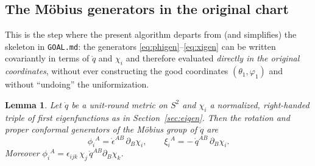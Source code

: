 \documentclass[11pt]{article}
\newtheorem{lemma}{Lemma}
\newcommand{\qo}{\mathring{q}}          %
\newcommand{\epso}{\mathring{\epsilon}} %
\begin{document}
\subsection{The M\"obius generators in the original chart}
\label{sec:generators}

This is the step where the present algorithm departs from (and simplifies)
the skeleton in \texttt{GOAL.md}: the generators
\eqref{eq:phigen}--\eqref{eq:xigen} can be written covariantly in terms of
$\qo$ and $\chi_i$ and therefore evaluated \emph{directly in the original
coordinates}, without ever constructing the good coordinates
$(\theta_1,\varphi_1)$ and without ``undoing'' the uniformization.

\begin{lemma}\label{lem:generators}
Let $\qo$ be a unit-round metric on $S^2$ and $\chi_i$ a normalized,
right-handed triple of first eigenfunctions as in
Section~\ref{sec:eigen}.  Then the rotation and proper conformal generators
of the M\"obius group of $\qo$ are
\begin{equation}
  \boxed{\;
  \phi_i{}^A = \epso^{AB}\,\partial_B \chi_i,
  \qquad
  \xi_i{}^A = -\,\qo^{AB}\,\partial_B \chi_i .
  \;}
  \label{eq:generatorscov}
\end{equation}
Moreover $\phi_i{}^A = \epsilon_{ijk}\,\chi_j\,\qo^{AB}\partial_B\chi_k$.
\end{lemma}
\end{document}
